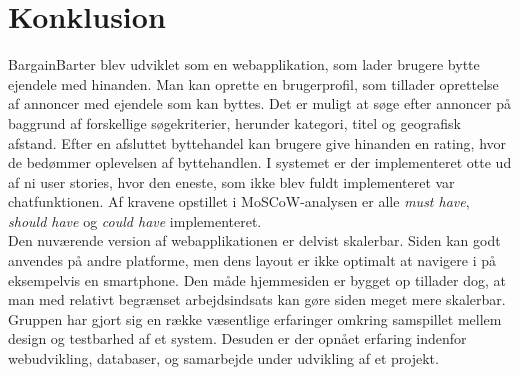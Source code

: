 \chapter{Konklusion}
BargainBarter blev udviklet som en webapplikation, som lader brugere bytte ejendele med hinanden. Man kan oprette en brugerprofil, som tillader oprettelse af annoncer med ejendele som kan byttes. Det er muligt at søge efter annoncer på baggrund af forskellige søgekriterier, herunder kategori, titel og geografisk afstand. Efter en afsluttet byttehandel kan brugere give hinanden en rating, hvor de bedømmer oplevelsen af byttehandlen. I systemet er der implementeret otte ud af ni user stories, hvor den eneste, som ikke blev fuldt implementeret var chatfunktionen. Af kravene opstillet i MoSCoW-analysen er alle \textit{must have}, \textit{should have} og \textit{could have} implementeret.\\ 

\noindent Den nuværende version af webapplikationen er delvist skalerbar. Siden kan godt anvendes på andre platforme, men dens layout er ikke optimalt at navigere i på eksempelvis en smartphone. Den måde hjemmesiden er bygget op tillader dog, at man med relativt begrænset arbejdsindsats kan gøre siden meget mere skalerbar.\\

\noindent Gruppen har gjort sig en række væsentlige erfaringer omkring samspillet mellem design og testbarhed af et system. Desuden er der opnået erfaring indenfor webudvikling, databaser, og samarbejde under udvikling af et projekt.

 







